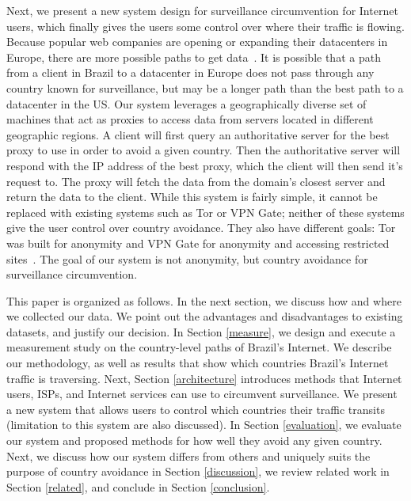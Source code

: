 Next, we present a new system design for surveillance circumvention for Internet users, which finally gives the users some control over where their traffic is flowing.  Because popular web companies are opening or expanding their datacenters in Europe, there are more possible paths to get data~\cite{eu_datacenters}.  It is possible that a path from a client in Brazil to a datacenter in Europe does not pass through any country known for surveillance, but may be a longer path than the best path to a datacenter in the US.  Our system leverages a geographically diverse set of machines that act as proxies to access data from servers located in different geographic regions.  A client will first query an authoritative server for the best proxy to use in order to avoid a given country.  Then the authoritative server will respond with the IP address of the best proxy, which the client will then send it's request to.  The proxy will fetch the data from the domain's closest server and return the data to the client.  While this system is fairly simple, it cannot be replaced with existing systems such as Tor or VPN Gate; neither of these systems give the user control over country avoidance.  They also have different goals: Tor was built for anonymity and VPN Gate for anonymity and accessing restricted sites~\cite{tor, vpngate}.  The goal of our system is not anonymity, but country avoidance for surveillance circumvention.

This paper is organized as follows.  In the next section, we discuss how and where we collected our data.  We point out the advantages and disadvantages to existing datasets, and justify our decision.  In Section \ref{measure}, we design and execute a measurement study on the country-level paths of Brazil's Internet.  We describe our methodology, as well as results that show which countries Brazil's Internet traffic is traversing.  Next, Section \ref{architecture} introduces methods that Internet users, ISPs, and Internet services can use to circumvent surveillance.  We present a new system that allows users to control which countries their traffic transits (limitation to this system are also discussed).  In Section \ref{evaluation}, we evaluate our system and proposed methods for how well they avoid any given country.  Next, we discuss how our system differs from others and uniquely suits the purpose of country avoidance in Section \ref{discussion}, we review related work in Section \ref{related}, and conclude in Section \ref{conclusion}.
